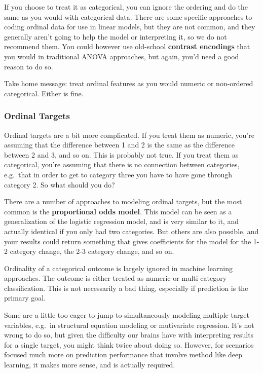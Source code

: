 \documentclass[
  letterpaper,
]{krantz}
\begin{document}
If you choose to treat it as categorical, you can ignore the ordering
and do the same as you would with categorical data. There are some
specific approaches to coding ordinal data for use in linear models, but
they are not common, and they generally aren't going to help the model
or interpreting it, so we do not recommend them. You could however use
old-school \textbf{contrast encodings} that you would in traditional
ANOVA approaches, but again, you'd need a good reason to do so.

Take home message: treat ordinal features as you would numeric or
non-ordered categorical. Either is fine.

\subsubsection{Ordinal Targets}\label{ordinal-targets}

Ordinal targets are a bit more complicated. If you treat them as
numeric, you're assuming that the difference between 1 and 2 is the same
as the difference between 2 and 3, and so on. This is probably not true.
If you treat them as categorical, you're assuming that there is no
connection between categories, e.g.~that in order to get to category
three you have to have gone through category 2. So what should you do?

There are a number of approaches to modeling ordinal targets, but the
most common is the \textbf{proportional odds model}. This model can be
seen as a generalization of the logistic regression model, and is very
similar to it, and actually identical if you only had two categories.
But others are also possible, and your results could return something
that gives coefficients for the model for the 1-2 category change, the
2-3 category change, and so on.

Ordinality of a categorical outcome is largely ignored in machine
learning approaches. The outcome is either treated as numeric or
multi-category classification. This is not necessarily a bad thing,
especially if prediction is the primary goal.

\begin{tcolorbox}[enhanced jigsaw, opacityback=0, leftrule=.75mm, bottomrule=.15mm, colframe=quarto-callout-tip-color-frame, rightrule=.15mm, breakable, left=2mm, colback=white, arc=.35mm, toprule=.15mm]

Some are a little too eager to jump to simultaneously modeling multiple
target variables, e.g.~in structural equation modeling or mutivariate
regression. It's not wrong to do so, but given the difficulty our brains
have with interpreting results for a single target, you might think
twice about doing so. However, for scenarios focused much more on
prediction performance that involve method like deep learning, it makes
more sense, and is actually required.

\end{tcolorbox}
\end{document}
